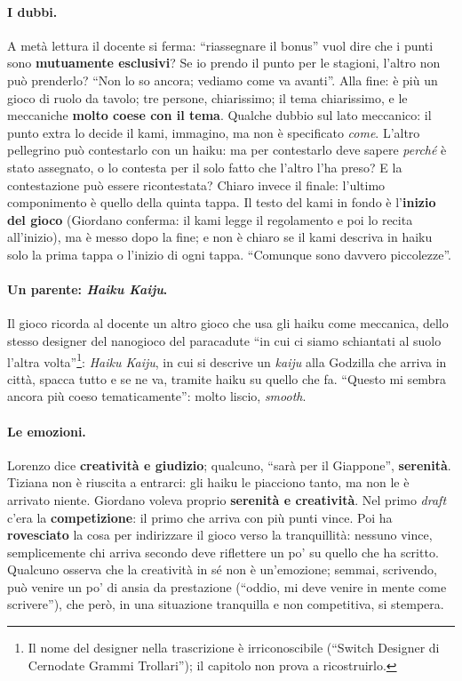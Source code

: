 \paragraph{I dubbi.} A metà lettura il docente si ferma: ``riassegnare il bonus''
vuol dire che i punti sono \textbf{mutuamente esclusivi}? Se io prendo il punto per le
stagioni, l'altro non può prenderlo? ``Non lo so ancora; vediamo come va avanti''.
Alla fine: è più un gioco di ruolo da tavolo; tre persone, chiarissimo; il tema
chiarissimo, e le meccaniche \textbf{molto coese con il tema}. Qualche dubbio sul lato
meccanico: il punto extra lo decide il kami, immagino, ma non è specificato
\emph{come}. L'altro pellegrino può contestarlo con un haiku: ma per contestarlo deve
sapere \emph{perché} è stato assegnato, o lo contesta per il solo fatto che l'altro
l'ha preso? E la contestazione può essere ricontestata? Chiaro invece il finale:
l'ultimo componimento è quello della quinta tappa. Il testo del kami in fondo è
l'\textbf{inizio del gioco} (Giordano conferma: il kami legge il regolamento e poi lo
recita all'inizio), ma è messo dopo la fine; e non è chiaro se il kami descriva in
haiku solo la prima tappa o l'inizio di ogni tappa. ``Comunque sono davvero
piccolezze''.

\paragraph{Un parente: \emph{Haiku Kaiju}.} Il gioco ricorda al docente un altro gioco
che usa gli haiku come meccanica, dello stesso designer del nanogioco del paracadute
``in cui ci siamo schiantati al suolo l'altra volta''\footnote{Il nome del designer
nella trascrizione è irriconoscibile (``Switch Designer di Cernodate Grammi
Trollari''); il capitolo non prova a ricostruirlo.}: \emph{Haiku Kaiju}, in cui si
descrive un \emph{kaiju} alla Godzilla che arriva in città, spacca tutto e se ne va,
tramite haiku su quello che fa. ``Questo mi sembra ancora più coeso tematicamente'':
molto liscio, \emph{smooth}.

\paragraph{Le emozioni.} Lorenzo dice \textbf{creatività e giudizio}; qualcuno,
``sarà per il Giappone'', \textbf{serenità}. Tiziana non è riuscita a entrarci: gli
haiku le piacciono tanto, ma non le è arrivato niente. Giordano voleva proprio
\textbf{serenità e creatività}. Nel primo \emph{draft} c'era la
\textbf{competizione}: il primo che arriva con più punti vince. Poi ha
\textbf{rovesciato} la cosa per indirizzare il gioco verso la tranquillità: nessuno
vince, semplicemente chi arriva secondo deve riflettere un po' su quello che ha
scritto. Qualcuno osserva che la creatività in sé non è un'emozione; semmai, scrivendo,
può venire un po' di ansia da prestazione (``oddio, mi deve venire in mente come
scrivere''), che però, in una situazione tranquilla e non competitiva, si stempera.

